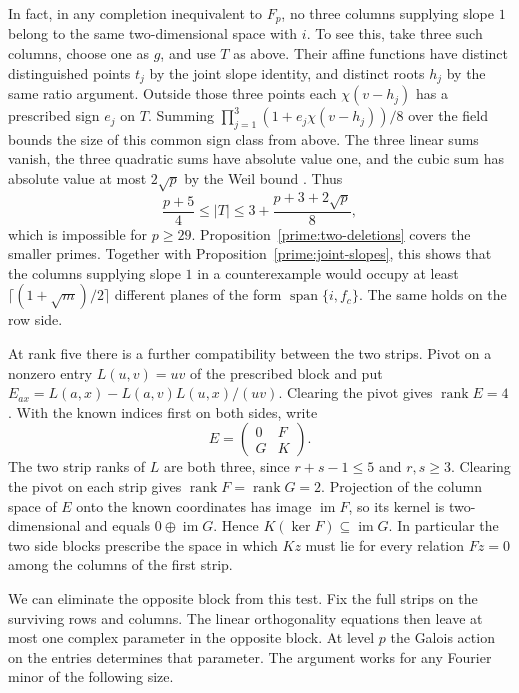 \documentclass[11pt,a4paper]{article}
\numberwithin{equation}{section}
\begin{document}
In fact, in any completion inequivalent to $F_p$, no three columns supplying slope $1$ belong to the same two-dimensional space with $i$. To see this, take three such columns, choose one as $g$, and use $T$ as above. Their affine functions have distinct distinguished points $t_j$ by the joint slope identity, and distinct roots $h_j$ by the same ratio argument. Outside those three points each $\chi(v-h_j)$ has a prescribed sign $e_j$ on $T$. Summing $\prod_{j=1}^3(1+e_j\chi(v-h_j))/8$ over the field bounds the size of this common sign class from above. The three linear sums vanish, the three quadratic sums have absolute value one, and the cubic sum has absolute value at most $2\sqrt p$ by the Weil bound \cite[Theorem~5.41]{ln}. Thus
$$\frac{p+5}{4}\le |T|\le 3+\frac{p+3+2\sqrt p}{8},$$
which is impossible for $p\ge29$. Proposition~\ref{prime:two-deletions} covers the smaller primes. Together with Proposition~\ref{prime:joint-slopes}, this shows that the columns supplying slope $1$ in a counterexample would occupy at least $\lceil(1+\sqrt m)/2\rceil$ different planes of the form $\operatorname{span}\{i,f_c\}$. The same holds on the row side.

At rank five there is a further compatibility between the two strips. Pivot on a nonzero entry $L(u,v)=uv$ of the prescribed block and put $E_{ax}=L(a,x)-L(a,v)L(u,x)/(uv)$. Clearing the pivot gives $\operatorname{rank}E=4$. With the known indices first on both sides, write
$$E=\begin{pmatrix}0&F\\G&K\end{pmatrix}.$$
The two strip ranks of $L$ are both three, since $r+s-1\le5$ and $r,s\ge3$. Clearing the pivot on each strip gives $\operatorname{rank}F=\operatorname{rank}G=2$. Projection of the column space of $E$ onto the known coordinates has image $\operatorname{im}F$, so its kernel is two-dimensional and equals $0\oplus\operatorname{im}G$. Hence $K(\ker F)\subseteq\operatorname{im}G$. In particular the two side blocks prescribe the space in which $Kz$ must lie for every relation $Fz=0$ among the columns of the first strip.

We can eliminate the opposite block from this test. Fix the full strips on the surviving rows and columns. The linear orthogonality equations then leave at most one complex parameter in the opposite block. At level $p$ the Galois action on the entries determines that parameter. The argument works for any Fourier minor of the following size.
\end{document}
